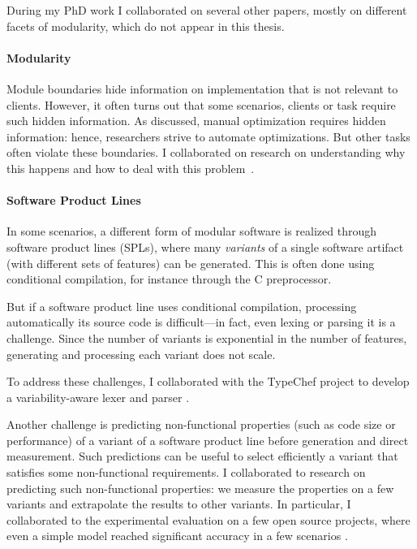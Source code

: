 During my PhD work I collaborated on several other papers, mostly on different facets of
modularity, which do not appear in this thesis.

\paragraph{Modularity}
Module boundaries hide information on implementation that is not relevant to
clients. However, it often turns out that some scenarios, clients or task
require such hidden information. As discussed, manual optimization requires
hidden information: hence, researchers strive to automate optimizations. But
other tasks often violate these boundaries. I collaborated on research on
understanding why this happens and how to deal with this
problem~\citep*{OGKR:ECOOP11}.

\paragraph{Software Product Lines}
In some scenarios, a different form of modular software is realized through
software product lines (SPLs), where many \emph{variants} of a single software
artifact (with different sets of features) can be generated. This is often done
using conditional compilation, for instance through the C preprocessor.

But if a software product line uses conditional compilation, processing
automatically its source code is difficult---in fact, even lexing or parsing it
is a challenge. Since the number of variants is exponential in the number of
features, generating and processing each variant does not scale.

To address these
challenges, I collaborated with the TypeChef project to develop a
variability-aware lexer \citep*{KPO:VaMoS11} and parser
\citep*{KGREOB:OOPSLA11}.

Another challenge is predicting non-functional properties (such as code size or
performance) of a variant of a software product line before generation and
direct measurement. Such predictions can be useful to select efficiently a
variant that satisfies some non-functional requirements.
I collaborated to research on predicting such non-functional properties: we
measure the properties on a few variants and extrapolate the results to other
variants. In particular, I collaborated to the experimental evaluation on a few
open source projects, where even a simple model reached significant accuracy in a
few scenarios \citep*{SRKGAK:SPLC11,siegmund2013scalable}.

